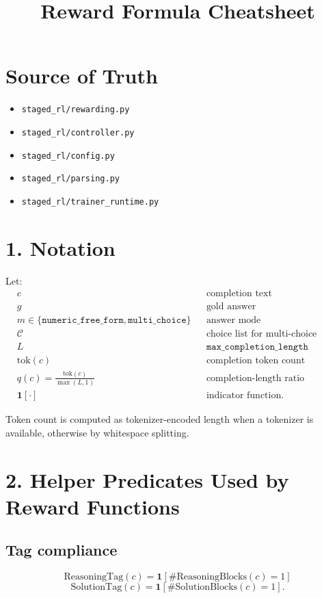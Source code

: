 \documentclass[11pt]{article}
\newcommand{\ind}{\mathbf{1}}
\begin{document}
\title{Reward Formula Cheatsheet}
\author{}
\date{}
\maketitle

\section*{Source of Truth}
\begin{itemize}
\item \texttt{staged\_rl/rewarding.py}
\item \texttt{staged\_rl/controller.py}
\item \texttt{staged\_rl/config.py}
\item \texttt{staged\_rl/parsing.py}
\item \texttt{staged\_rl/trainer\_runtime.py}
\end{itemize}

\section*{1. Notation}
Let:
\begin{align*}
&c && \text{completion text} \\
&g && \text{gold answer} \\
&m \in \{\texttt{numeric\_free\_form}, \texttt{multi\_choice}\} && \text{answer mode} \\
&\mathcal{C} && \text{choice list for multi-choice examples} \\
&L && \texttt{max\_completion\_length} \\
&\mathrm{tok}(c) && \text{completion token count} \\
&q(c) = \frac{\mathrm{tok}(c)}{\max(L,1)} && \text{completion-length ratio} \\
&\ind[\cdot] && \text{indicator function.}
\end{align*}

Token count is computed as tokenizer-encoded length when a tokenizer is available, otherwise by whitespace splitting.

\section*{2. Helper Predicates Used by Reward Functions}

\subsection*{Tag compliance}
\[
\mathrm{ReasoningTag}(c) = \ind\!\left[\#\mathrm{ReasoningBlocks}(c)=1\right]
\]
\[
\mathrm{SolutionTag}(c) = \ind\!\left[\#\mathrm{SolutionBlocks}(c)=1\right].
\]
\end{document}
